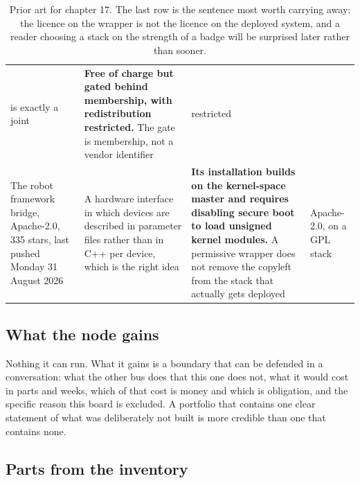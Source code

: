\begin{table}[H]
\begin{tabular}{p{34mm}p{46mm}p{38mm}p{20mm}}
is exactly a joint & \textbf{Free of charge but gated behind membership, with
redistribution restricted.} The gate is membership, not a vendor identifier &
restricted \\
The robot framework bridge, Apache-2.0, 335 stars, last pushed Monday 31 August
2026 & A hardware interface in which devices are described in parameter files
rather than in C++ per device, which is the right idea & \textbf{Its
installation builds on the kernel-space master and requires disabling secure
boot to load unsigned kernel modules.} A permissive wrapper does not remove the
copyleft from the stack that actually gets deployed & Apache-2.0, on a GPL stack
\\
\bottomrule
\end{tabular}
\caption{Prior art for chapter 17. The last row is the sentence most worth carrying away: the licence on the wrapper is not the licence on the deployed system, and a reader choosing a stack on the strength of a badge will be surprised later rather than sooner.}
\end{table}

\subsection*{What the node gains}

Nothing it can run. What it gains is a boundary that can be defended in a
conversation: what the other bus does that this one does not, what it would cost
in parts and weeks, which of that cost is money and which is obligation, and the
specific reason this board is excluded. A portfolio that contains one clear
statement of what was deliberately not built is more credible than one that
contains none.

\subsection*{Parts from the inventory}


